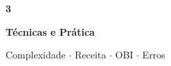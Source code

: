 \documentclass[aspectratio=169,10pt]{beamer}
\begin{document}
{
\begin{frame}[noframenumbering]
  \centering\vspace{1.0cm}
  {\fontsize{36}{44}\selectfont\bfseries\color{gemaBlue} 3}\par
  \vspace{0.22cm}
  {\Large\color{dpTeal}\bfseries Técnicas e Prática}\par
  \vspace{0.14cm}
  {\color{gray}\small Complexidade $\cdot$ Receita $\cdot$ OBI $\cdot$ Erros}
\end{frame}
}

\end{document}
